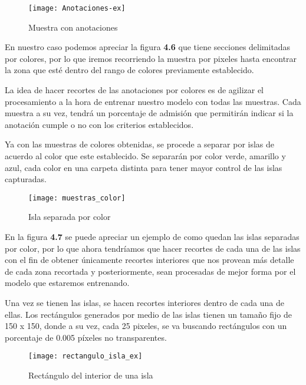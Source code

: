 \begin{figure}[H]
  \centering
  \begin{minipage}[b]{0.5\textwidth}
        \texttt{[image: Anotaciones-ex]}
    \caption{Muestra con anotaciones}
  \end{minipage}
\end{figure}

En nuestro caso podemos apreciar la figura \textbf{4.6} que tiene secciones delimitadas por colores, por lo que iremos recorriendo la muestra por pixeles hasta encontrar la zona que esté dentro del rango de colores previamente establecido.

La idea de hacer recortes de las anotaciones por colores es de agilizar el procesamiento a la hora de entrenar nuestro modelo con todas las muestras. Cada muestra a su vez, tendrá un porcentaje de admisión que permitirán indicar si la anotación cumple o no con los criterios establecidos.

Ya con las muestras de colores obtenidas, se procede a separar por islas de acuerdo al color que este establecido. Se separarán por color verde, amarillo y azul, cada color en una carpeta distinta para tener mayor control de las islas capturadas.

\begin{figure}[H]
  \centering
  \begin{minipage}[b]{0.5\textwidth}
        \texttt{[image: muestras\_color]}
    \caption{Isla separada por color}
  \end{minipage}
\end{figure}

En la figura \textbf{4.7} se puede apreciar un ejemplo de como quedan las islas separadas por color, por lo que ahora tendríamos que hacer recortes de cada una de las islas con el fin de obtener únicamente recortes interiores que nos provean más detalle de cada zona recortada y posteriormente, sean procesadas de mejor forma por el modelo que estaremos entrenando. \\

\break

Una vez se tienen las islas, se hacen recortes interiores dentro de cada una de ellas. Los rectángulos generados por medio de las islas tienen un tamaño fijo de 150 x 150, donde a su vez, cada 25 pixeles, se va buscando rectángulos con un porcentaje de 0.005 píxeles no transparentes.


\begin{figure}[h]
  \centering
  \begin{minipage}[b]{0.7\textwidth}
        \texttt{[image: rectangulo\_isla\_ex]}
    \caption{Rectángulo del interior de una isla}
  \end{minipage}
\end{figure}


